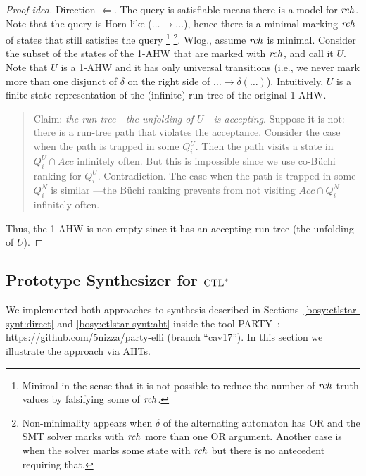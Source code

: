 \begin{proof}[Proof idea]
Direction $\Leftarrow$.
The query is satisfiable means there is a model for $\mathit{rch}$.
Note that the query is Horn-like ($\ldots  \rightarrow \ldots $),
hence there is a minimal marking $\mathit{rch}$ of states
that still satisfies the query%
\footnote{Minimal in the sense that it is not possible
          to reduce the number of $\mathit{rch}$ truth values
          by falsifying some of $\mathit{rch}$.}%
\footnote{Non-minimality appears when $\delta$
          of the alternating automaton has OR
          and the SMT solver marks with $\mathit{rch}$
          more than one OR argument.
          Another case is when the solver
          marks some state with $\mathit{rch}$
          but there is no antecedent requiring that.}.
Wlog., assume $\mathit{rch}$ is minimal.
Consider the subset of the states of the 1-AHW that are marked with $\mathit{rch}$,
and call it $U$.
Note that $U$ is a 1-AHW and it has only universal transitions
(i.e., we never mark more than one disjunct of $\delta$ on the right side of
 $\ldots \rightarrow \delta(\ldots)$).
Intuitively,
$U$ is a finite-state representation of the (infinite) run-tree of the original 1-AHW.

\begin{quote}
Claim: {\em the run-tree---the unfolding of $U$---is accepting}.
Suppose it is not:
there is a run-tree path that violates the acceptance.
Consider the case when the path is trapped in some $Q^U_i$.
Then the path visits a state in $Q^U_i \cap Acc$
infinitely often.
But this is impossible since we use co-B\"uchi ranking for $Q_i^U$.
Contradiction.
The case when the path is trapped in some $Q_i^N$ is similar%
---the B\"uchi ranking prevents from not visiting $Acc\cap Q_i^N$ infinitely often.
\end{quote}
Thus, the 1-AHW is non-empty since it has an accepting run-tree (the unfolding of $U$).
\end{proof}


\subsection{Prototype Synthesizer for ${\text{CTL}^*}$}\label{bosy:experiments}

We implemented both approaches to \CTLstar synthesis described
in Sections~\ref{bosy:ctlstar-synt:direct} and \ref{bosy:ctlstar-synt:aht}
inside the tool PARTY~\cite{party}:
{\small\url{https://github.com/5nizza/party-elli}} (branch ``cav17'').
In this section we illustrate the approach via AHTs.

